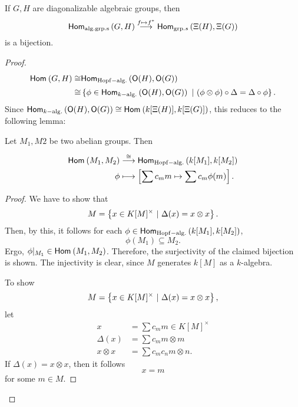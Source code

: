 \begin{lemma}
If $G,H$ are diagonalizable algebraic groups, then
\[ \textsf{Hom}_{\mathrm{alg.grp.s}}\left(G, H\right) \overset{f \mapsto f^*}{\longrightarrow} \textsf{Hom}_{\mathrm{grp.}s}\left(\Xi(H), \Xi(G)\right) \]
is a bijection.
\end{lemma}
\begin{proof}
\begin{align*}
\textsf{Hom}_{}\left(G, H\right) \overset{}{\cong} &\textsf{Hom}_{\mathrm{Hopf-alg.}}\left(\mathsf{O}(H), \mathsf{O}(G)\right)\\
 \overset{}{\cong} &\left\lbrace\phi \in \textsf{Hom}_{k\mathrm{-alg.}}\left(\mathsf{O}(H), \mathsf{O}(G)\right) ~ | ~ (\phi \otimes \phi) \circ \Delta = \Delta \circ \phi\right\rbrace.
\end{align*}
Since $\textsf{Hom}_{k\mathrm{-alg.}}\left(\mathsf{O}(H), \mathsf{O}(G)\right) \overset{}{\cong} \textsf{Hom}_{}\left(k[\Xi(H)], k[\Xi(G)]\right)$, this reduces to the following lemma:
\begin{lemma}
Let $M_1, M2$ be two abelian groups. Then
\begin{align*}
\textsf{Hom}_{}\left(M_1, M_2\right) & \overset{\overset{}{\cong}}{\longrightarrow} \textsf{Hom}_{\mathrm{Hopf-alg.}}\left(k[M_1], k[M_2]\right)\\
\phi & \longmapsto \left[ \sum c_m m \mapsto \sum c_m \phi(m) \right] .
\end{align*}
\end{lemma}
\begin{proof}
We have to show that
\[ M = \left\lbrace x \in K[M]^\times ~ | ~ \Delta(x) = x \otimes x\right\rbrace. \]
Then, by this, it follows for each $\phi \in \textsf{Hom}_{\mathrm{Hopf-alg.}}\left(k[M_1], k[M_2]\right)$,
\[ \phi(M_1) \subseteq M_2. \]
Ergo, $\phi|_{M_1} \in \textsf{Hom}_{}\left(M_1, M_2\right)$. Therefore, the surjectivity of the claimed bijection is shown.
The injectivity is clear, since $M$ generates $k[M]$ as a $k$-algebra.

To show
\[ M = \left\lbrace x \in K[M]^\times ~ | ~ \Delta(x) = x \otimes x\right\rbrace, \]
let
\begin{align*}
x &= \sum c_m m\in K[M]^\times\\
\Delta(x) &= \sum c_m m \otimes m\\
x \otimes x &= \sum c_m c_n m\otimes n.
\end{align*}
If $\Delta(x) = x \otimes x$, then it follows
\[ x = m \]
for some $m \in M$.

\end{proof}
\end{proof}